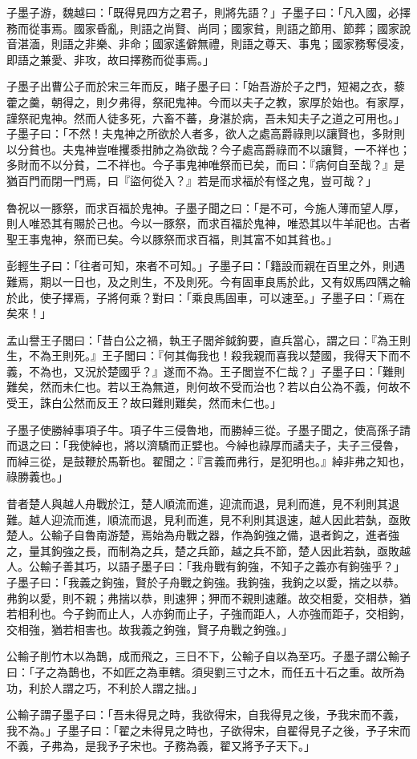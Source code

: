 \begin{pinyinscope}
子墨子游，魏越曰：「既得見四方之君子，則將先語？」子墨子曰：「凡入國，必擇務而從事焉。國家昏亂，則語之尚賢、尚同；國家貧，則語之節用、節葬；國家說音湛湎，則語之非樂、非命；國家遙僻無禮，則語之尊天、事鬼；國家務奪侵凌，即語之兼愛、非攻，故曰擇務而從事焉。」

子墨子出曹公子而於宋三年而反，睹子墨子曰：「始吾游於子之門，短褐之衣，藜藿之羹，朝得之，則夕弗得，祭祀鬼神。今而以夫子之教，家厚於始也。有家厚，謹祭祀鬼神。然而人徒多死，六畜不蕃，身湛於病，吾未知夫子之道之可用也。」子墨子曰：「不然！夫鬼神之所欲於人者多，欲人之處高爵祿則以讓賢也，多財則以分貧也。夫鬼神豈唯攫黍拑肺之為欲哉？今子處高爵祿而不以讓賢，一不祥也；多財而不以分貧，二不祥也。今子事鬼神唯祭而已矣，而曰：『病何自至哉？』是猶百門而閉一門焉，曰『盜何從入？』若是而求福於有怪之鬼，豈可哉？」

魯祝以一豚祭，而求百福於鬼神。子墨子聞之曰：「是不可，今施人薄而望人厚，則人唯恐其有賜於己也。今以一豚祭，而求百福於鬼神，唯恐其以牛羊祀也。古者聖王事鬼神，祭而已矣。今以豚祭而求百福，則其富不如其貧也。」

彭輕生子曰：「往者可知，來者不可知。」子墨子曰：「籍設而親在百里之外，則遇難焉，期以一日也，及之則生，不及則死。今有固車良馬於此，又有奴馬四隅之輪於此，使子擇焉，子將何乘？對曰：「乘良馬固車，可以速至。」子墨子曰：「焉在矣來！」

孟山譽王子閭曰：「昔白公之禍，執王子閭斧鉞鉤要，直兵當心，謂之曰：『為王則生，不為王則死。』王子閭曰：『何其侮我也！殺我親而喜我以楚國，我得天下而不義，不為也，又況於楚國乎？』遂而不為。王子閭豈不仁哉？」子墨子曰：「難則難矣，然而未仁也。若以王為無道，則何故不受而治也？若以白公為不義，何故不受王，誅白公然而反王？故曰難則難矣，然而未仁也。」

子墨子使勝綽事項子牛。項子牛三侵魯地，而勝綽三從。子墨子聞之，使高孫子請而退之曰：「我使綽也，將以濟驕而正嬖也。今綽也祿厚而譎夫子，夫子三侵魯，而綽三從，是鼓鞭於馬靳也。翟聞之：『言義而弗行，是犯明也。』綽非弗之知也，祿勝義也。」

昔者楚人與越人舟戰於江，楚人順流而進，迎流而退，見利而進，見不利則其退難。越人迎流而進，順流而退，見利而進，見不利則其退速，越人因此若埶，亟敗楚人。公輸子自魯南游楚，焉始為舟戰之器，作為鉤強之備，退者鉤之，進者強之，量其鉤強之長，而制為之兵，楚之兵節，越之兵不節，楚人因此若埶，亟敗越人。公輸子善其巧，以語子墨子曰：「我舟戰有鉤強，不知子之義亦有鉤強乎？」子墨子曰：「我義之鉤強，賢於子舟戰之鉤強。我鉤強，我鉤之以愛，揣之以恭。弗鉤以愛，則不親；弗揣以恭，則速狎；狎而不親則速離。故交相愛，交相恭，猶若相利也。今子鉤而止人，人亦鉤而止子，子強而距人，人亦強而距子，交相鉤，交相強，猶若相害也。故我義之鉤強，賢子舟戰之鉤強。」

公輸子削竹木以為鵲，成而飛之，三日不下，公輸子自以為至巧。子墨子謂公輸子曰：「子之為鵲也，不如匠之為車轄。須臾劉三寸之木，而任五十石之重。故所為功，利於人謂之巧，不利於人謂之拙。」

公輸子謂子墨子曰：「吾未得見之時，我欲得宋，自我得見之後，予我宋而不義，我不為。」子墨子曰：「翟之未得見之時也，子欲得宋，自翟得見子之後，予子宋而不義，子弗為，是我予子宋也。子務為義，翟又將予子天下。」


\end{pinyinscope}
